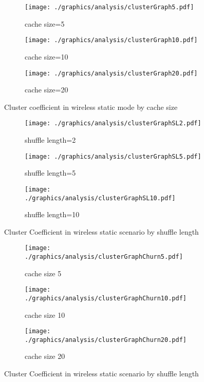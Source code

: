 \begin{figure}
\centering
\begin{subfigure}{\textwidth}
	\centering
	\texttt{[image: ./graphics/analysis/clusterGraph5.pdf]}
	\caption{ cache size=5}
	\label{fig:ClusterCoef5small}
\end{subfigure}
\begin{subfigure}{\textwidth}
	\centering
	\texttt{[image: ./graphics/analysis/clusterGraph10.pdf]}
	\caption{ cache size=10}
	\label{fig:ClusterCoef10small}
\end{subfigure}
\begin{subfigure}{\textwidth}
	\centering
	\texttt{[image: ./graphics/analysis/clusterGraph20.pdf]}
	\caption{cache size=20}
	\label{fig:ClusterCoef20small}
\end{subfigure}
\caption{Cluster coefficient in wireless static mode by cache size}
\end{figure}

\begin{figure}
\begin{subfigure}{\textwidth}
	\centering
	\texttt{[image: ./graphics/analysis/clusterGraphSL2.pdf]}
	\caption{shuffle length=2}
	\label{fig:ClusterCoefSL2small}
\end{subfigure}
\begin{subfigure}{\textwidth}
	\centering
	\texttt{[image: ./graphics/analysis/clusterGraphSL5.pdf]}
	\caption{shuffle length=5}
	\label{fig:ClusterCoefSL5small}
\end{subfigure}
\begin{subfigure}{\textwidth}
	\centering
	\texttt{[image: ./graphics/analysis/clusterGraphSL10.pdf]}
	\caption{shuffle length=10}
	\label{fig:ClusterCoefSL10small}
\end{subfigure}
\caption{Cluster Coefficient in wireless static scenario by shuffle length}
\end{figure}

\begin{figure}
\begin{subfigure}{\textwidth}
	\centering
	\texttt{[image: ./graphics/analysis/clusterGraphChurn5.pdf]}
	\caption{cache size 5}
	\label{fig:ClusterCoefChurn5small}
\end{subfigure}
\begin{subfigure}{\textwidth}
	\centering
	\texttt{[image: ./graphics/analysis/clusterGraphChurn10.pdf]}
	\caption{cache size 10}
	\label{fig:ClusterCoefChurn5small}
\end{subfigure}
\begin{subfigure}{\textwidth}
	\centering
	\texttt{[image: ./graphics/analysis/clusterGraphChurn20.pdf]}
	\caption{cache size 20}
	\label{fig:ClusterCoefChurn5small}
\end{subfigure}
\caption{Cluster Coefficient in wireless static scenario by shuffle length}
\end{figure}


